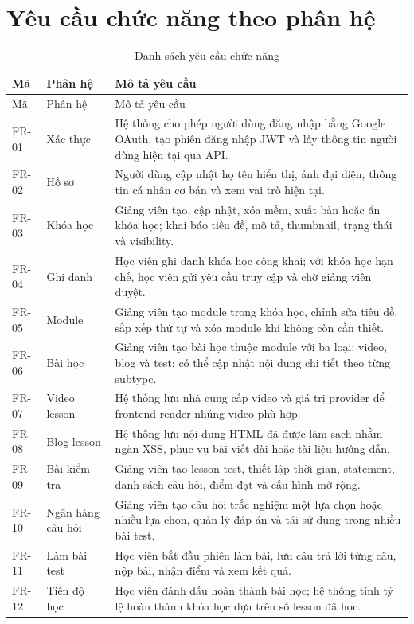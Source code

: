 \documentclass[12pt,a4paper]{report}
\begin{document}
\section{Yêu cầu chức năng theo phân hệ}
\begin{longtable}{L{1.4cm} L{3cm} L{9cm}}
\caption{Danh sách yêu cầu chức năng}\label{tab:functional}\\
\toprule
Mã & Phân hệ & Mô tả yêu cầu \\
\midrule
\endfirsthead
\toprule
Mã & Phân hệ & Mô tả yêu cầu \\
\midrule
\endhead
FR-01 & Xác thực & Hệ thống cho phép người dùng đăng nhập bằng Google OAuth, tạo phiên đăng nhập JWT và lấy thông tin người dùng hiện tại qua API. \\
FR-02 & Hồ sơ & Người dùng cập nhật họ tên hiển thị, ảnh đại diện, thông tin cá nhân cơ bản và xem vai trò hiện tại. \\
FR-03 & Khóa học & Giảng viên tạo, cập nhật, xóa mềm, xuất bản hoặc ẩn khóa học; khai báo tiêu đề, mô tả, thumbnail, trạng thái và visibility. \\
FR-04 & Ghi danh & Học viên ghi danh khóa học công khai; với khóa học hạn chế, học viên gửi yêu cầu truy cập và chờ giảng viên duyệt. \\
FR-05 & Module & Giảng viên tạo module trong khóa học, chỉnh sửa tiêu đề, sắp xếp thứ tự và xóa module khi không còn cần thiết. \\
FR-06 & Bài học & Giảng viên tạo bài học thuộc module với ba loại: video, blog và test; có thể cập nhật nội dung chi tiết theo từng subtype. \\
FR-07 & Video lesson & Hệ thống lưu nhà cung cấp video và giá trị provider để frontend render nhúng video phù hợp. \\
FR-08 & Blog lesson & Hệ thống lưu nội dung HTML đã được làm sạch nhằm ngăn XSS, phục vụ bài viết dài hoặc tài liệu hướng dẫn. \\
FR-09 & Bài kiểm tra & Giảng viên tạo lesson test, thiết lập thời gian, statement, danh sách câu hỏi, điểm đạt và cấu hình mở rộng. \\
FR-10 & Ngân hàng câu hỏi & Giảng viên tạo câu hỏi trắc nghiệm một lựa chọn hoặc nhiều lựa chọn, quản lý đáp án và tái sử dụng trong nhiều bài test. \\
FR-11 & Làm bài test & Học viên bắt đầu phiên làm bài, lưu câu trả lời từng câu, nộp bài, nhận điểm và xem kết quả. \\
FR-12 & Tiến độ học & Học viên đánh dấu hoàn thành bài học; hệ thống tính tỷ lệ hoàn thành khóa học dựa trên số lesson đã học. \\

\end{longtable}
\end{document}
